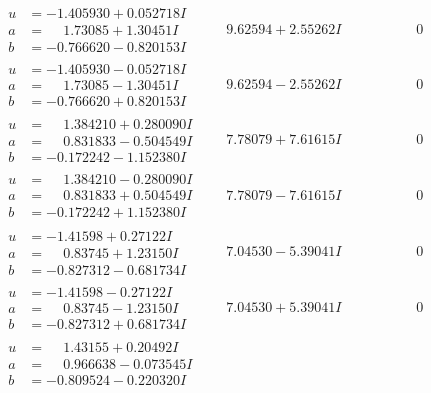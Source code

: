 \documentclass[1p]{elsarticle_modified}
\theoremstyle{definition}
\begin{document}
$$\begin{array}{c|c|c}
\begin{aligned}
u &= -1.405930 + 0.052718 I \\
a &= \phantom{-}1.73085 + 1.30451 I \\
b &= -0.766620 - 0.820153 I\end{aligned}
 & \phantom{-}9.62594 + 2.55262 I & \phantom{-0.000000 } 0 \\ \hline\begin{aligned}
u &= -1.405930 - 0.052718 I \\
a &= \phantom{-}1.73085 - 1.30451 I \\
b &= -0.766620 + 0.820153 I\end{aligned}
 & \phantom{-}9.62594 - 2.55262 I & \phantom{-0.000000 } 0 \\ \hline\begin{aligned}
u &= \phantom{-}1.384210 + 0.280090 I \\
a &= \phantom{-}0.831833 - 0.504549 I \\
b &= -0.172242 - 1.152380 I\end{aligned}
 & \phantom{-}7.78079 + 7.61615 I & \phantom{-0.000000 } 0 \\ \hline\begin{aligned}
u &= \phantom{-}1.384210 - 0.280090 I \\
a &= \phantom{-}0.831833 + 0.504549 I \\
b &= -0.172242 + 1.152380 I\end{aligned}
 & \phantom{-}7.78079 - 7.61615 I & \phantom{-0.000000 } 0 \\ \hline\begin{aligned}
u &= -1.41598 + 0.27122 I \\
a &= \phantom{-}0.83745 + 1.23150 I \\
b &= -0.827312 - 0.681734 I\end{aligned}
 & \phantom{-}7.04530 - 5.39041 I & \phantom{-0.000000 } 0 \\ \hline\begin{aligned}
u &= -1.41598 - 0.27122 I \\
a &= \phantom{-}0.83745 - 1.23150 I \\
b &= -0.827312 + 0.681734 I\end{aligned}
 & \phantom{-}7.04530 + 5.39041 I & \phantom{-0.000000 } 0 \\ \hline\begin{aligned}
u &= \phantom{-}1.43155 + 0.20492 I \\
a &= \phantom{-}0.966638 - 0.073545 I \\
b &= -0.809524 - 0.220320 I\end{aligned}

\end{array}$$
\end{document}
